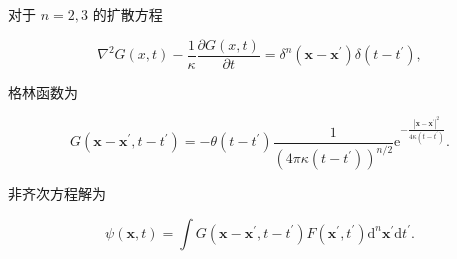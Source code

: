 对于 \(n=2, 3\) 的扩散方程

\[
\nabla^{2} G(x, t)-\frac{1}{\kappa} \frac{\partial G(x, t)}{\partial t} = \delta^{n}\left(\mathbf{x}-\mathbf{x}^{\prime}\right) \delta(t-t^{\prime}),
\]

格林函数为

\[
G(\mathbf{x}-\mathbf{x}^{\prime}, t-t^{\prime}) = -\theta(t-t^{\prime}) \frac{1}{(4 \pi \kappa (t-t^{\prime}))^{n/2}} \mathrm{e}^{-\frac{|\mathbf{x}-\mathbf{x}^{\prime}|^{2}}{4 \kappa (t-t^{\prime})}}.
\]

非齐次方程解为

\[
\psi(\mathbf{x}, t) = \int G(\mathbf{x}-\mathbf{x}^{\prime}, t-t^{\prime}) F(\mathbf{x}^{\prime}, t^{\prime}) \mathrm{d}^{n} \mathbf{x}^{\prime} \mathrm{d} t^{\prime}.
\]